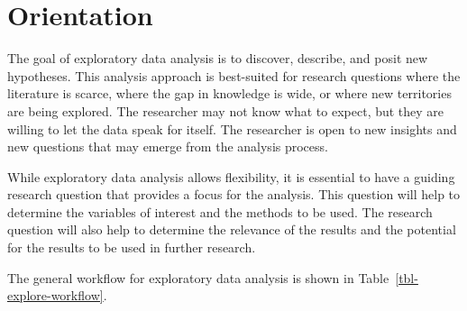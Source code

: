 \documentclass[
  letterpaper,
  krantz1]{latex/krantz-mod}
\theoremstyle{definition}
\theoremstyle{definition}
\theoremstyle{remark}
\begin{document}
\section{Orientation}\label{sec-explore-orientation}

The goal of exploratory data analysis is to discover, describe, and
posit new hypotheses. This
analysis approach is best-suited for research questions where the
literature is scarce, where the gap in knowledge is wide, or where new
territories are being explored. The researcher may not know what to
expect, but they are willing to let the data speak for itself. The
researcher is open to new insights and new questions that may emerge
from the analysis process.

While exploratory data analysis allows flexibility, it is essential to
have a guiding research question that provides
a focus for the analysis. This question will help to determine the
variables of interest and the methods to be used. The research question
will also help to determine the relevance of the results and the
potential for the results to be used in further research.

The general workflow for exploratory data analysis is shown in
Table~\ref{tbl-explore-workflow}.
\end{document}
